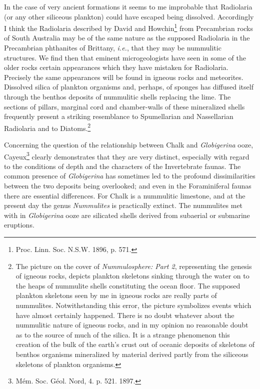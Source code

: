 \documentclass[a4paper, 12pt, oneside, landscape]{article}
\begin{document}
In the case of very ancient formations it seems to me improbable that Radiolaria (or any other siliceous plankton) could have escaped being dissolved. Accordingly I think the Radiolaria described by David and Howchin\footnote{Proc. Linn. Soc. N.S.W. 1896, p. 571.} from Precambrian rocks of South Australia may be of the same nature as the supposed Radiolaria in the Precambrian phthanites of Brittany, \emph{i.e.}, that they may be nummulitic structures. We find then that eminent microgeologists have seen in some of the older rocks certain appearances which they have mistaken for Radiolaria. Precisely the same appearances will be found in igneous rocks and meteorites. Dissolved silica of plankton organisms and, perhaps, of sponges has diffused itself through the benthos deposits of nummulitic shells replacing the lime. The sections of pillars, marginal cord and chamber-walls of these mineralized shells frequently present a striking resemblance to Spumellarian and Nassellarian Radiolaria and to Diatoms.\footnote{The picture on the cover of \emph{Nummulosphere: Part 2}, representing the genesis of igneous rocks, depicts plankton skeletons sinking through the water on to the heaps of nummulite shells constituting the ocean floor. The supposed plankton skeletons seen by me in igneous rocks are really parts of nummulites. Notwithstanding this error, the picture symbolizes events which have almost certainly happened. There is no doubt whatever about the nummulitic nature of igneous rocks, and in my opinion no reasonable doubt as to the source of much of the silica. It is a strange phenomenon this creation of the bulk of the earth's crust out of oceanic deposits of skeletons of benthos organisms mineralized by material derived partly from the siliceous skeletons of plankton organisms.}

Concerning the question of the relationship between Chalk and \emph{Globigerina} ooze, Cayeux\footnote{Mém. Soc. Géol. Nord, 4. p. 521. 1897.} clearly demonstrates that they are very distinct, especially with regard to the conditions of depth and the characters of the Invertebrate faunas. The common presence of \emph{Globigerina} has sometimes led to the profound dissimilarities between the two deposits being overlooked; and even in the Foraminiferal faunas there are essential differences. For Chalk is a nummulitic limestone, and at the present day the genus \emph{Nummulites} is practically extinct. The nummulites met with in \emph{Globigerina} ooze are silicated shells derived from subaerial or submarine eruptions.
\end{document}
